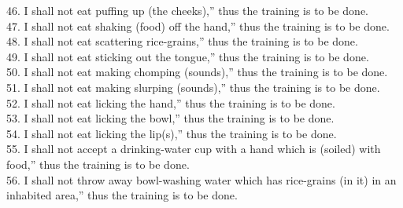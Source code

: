 \documentclass[12pt]{article}
\begin{document}
\begin{paracol}{2}
\begin{column}
{\begin{doublespace}
46. I shall not eat puffing up (the cheeks),” thus the training is to be done.\\
47. I shall not eat shaking (food) off the hand,” thus the training is to be done.\\
48. I shall not eat scattering rice-grains,” thus the training is to be done.\\
49. I shall not eat sticking out the tongue,” thus the training is to be done.\\
50. I shall not eat making chomping (sounds),” thus the training is to be done.\\
51. I shall not eat making slurping (sounds),” thus the training is to be done.\\
52. I shall not eat licking the hand,” thus the training is to be done.\\
53. I shall not eat licking the bowl,” thus the training is to be done.\\
54. I shall not eat licking the lip(s),” thus the training is to be done.\\
55. I shall not accept a drinking-water cup with a hand which is (soiled) with food,” thus the training is to be done.\\
56. I shall not throw away bowl-washing water which has rice-grains (in it) in an inhabited area,” thus the training is to be done.
\end{doublespace}}

\switchcolumn



\end{column}
\end{paracol}
\end{document}
